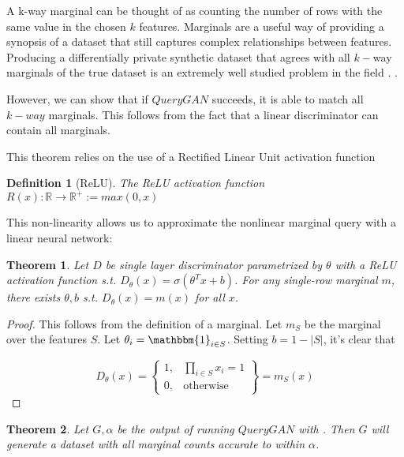 \documentclass[]{article}
\newtheorem{definition}{Definition}[section]
\newtheorem{theorem}{Theorem}[section]
\theoremstyle{definition}
\begin{document}
A k-way marginal can be thought of as counting the number of rows with the same value in the chosen $k$ features. Marginals are a useful way of providing a synopsis of a dataset that still captures complex relationships between features. Producing a differentially private synthetic dataset that agrees with all $k-$way marginals of the true dataset is an extremely well studied problem in the field . .

However, we can show that if $QueryGAN$ succeeds, it is able to match all $k-way$ marginals. This follows from the fact that a linear discriminator can contain all marginals.

This theorem relies on the use of a Rectified Linear Unit activation function

\begin{definition}[ReLU]
    The ReLU activation function $R(x) : \mathbb{R} \to \mathbb{R}^+ := max(0,x)$
\end{definition}

This non-linearity allows us to approximate the nonlinear marginal query with a linear neural network:

\begin{theorem}\label{thm:d-marginal}
    Let $D$ be single layer discriminator parametrized by $\theta$ with a ReLU activation function s.t. $D_\theta(x) = \sigma(\theta^Tx + b)$. For any single-row marginal $m$, there exists $\theta, b$ s.t. $D_\theta(x) = m(x)$ for all $x$.  
\end{theorem} 

\begin{proof}
    This follows from the definition of a marginal. Let $m_S$ be the marginal over the features $S$. Let $\theta_i = \mathbbm{1}_{i \in S}$. Setting $b = 1-|S|$, it's clear that 
    

    \begin{equation}
        D_\theta(x) = \left.
        \begin{cases}
          1, & \prod_{i \in S} x_i = 1 \\
          0, & \text{otherwise }
        \end{cases}
        \right\} = m_S(x)
    \end{equation}
\end{proof}

\begin{theorem}
    Let $G, \alpha$ be the output of running $QueryGAN$ with . Then $G$ will generate a dataset with all marginal counts accurate to within $\alpha$.
\end{theorem}
\end{document}
